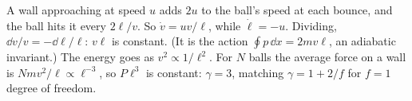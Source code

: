 A wall approaching at speed $u$ adds $2u$ to the ball's speed at each bounce, and the ball hits it every $2\ell/v$. So $\dot v = uv/\ell$, while $\dot\ell = -u$. Dividing, $\dd v/v = -\dd\ell/\ell$: $v\ell$ is constant. (It is the action $\oint p\,\dd x = 2mv\ell$, an adiabatic invariant.) The energy goes as $v^2\propto1/\ell^2$. For $N$ balls the average force on a wall is $Nmv^2/\ell\propto\ell^{-3}$, so $P\ell^3$ is constant: $\gamma = 3$, matching $\gamma = 1 + 2/f$ for $f = 1$ degree of freedom.
